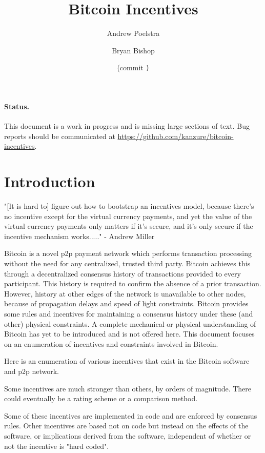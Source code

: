 \documentclass[letterpaper]{article}
\title{Bitcoin Incentives}
\author{Andrew Poelstra}
\author{Bryan Bishop}
\date{\gitAuthorDate{} (commit \texttt{\gitAbbrevHash)}}
\begin{document}
\maketitle

\paragraph{Status.} This document is a work in progress and is missing large
sections of text. Bug reports should be communicated at
\url{https://github.com/kanzure/bitcoin-incentives}.

\section{Introduction}

"[It is hard to] figure out how to bootstrap an incentives model, because
there's no incentive except for the virtual currency payments, and yet the
value of the virtual currency payments only matters if it's secure, and it's
only secure if the incentive mechanism works....." - Andrew Miller

Bitcoin is a novel p2p payment network which performs transaction processing
without the need for any centralized, trusted third party. Bitcoin achieves
this through a decentralized consensus history of transactions provided to
every participant. This history is required to confirm the absence of a prior
transaction. However, history at other edges of the network is unavailable to
other nodes, because of propagation delays and speed of light constraints.
Bitcoin provides some rules and incentives for maintaining a consensus history
under these (and other) physical constraints. A complete mechanical or physical
understanding of Bitcoin has yet to be introduced and is not offered here. This
document focuses on an enumeration of incentives and constraints involved in
Bitcoin.

Here is an enumeration of various incentives that exist in the Bitcoin software
and p2p network.

Some incentives are much stronger than others, by orders of magnitude. There
could eventually be a rating scheme or a comparison method.

Some of these incentives are implemented in code and are enforced by consensus
rules. Other incentives are based not on code but instead on the effects of the
software, or implications derived from the software, independent of whether or
not the incentive is "hard coded".
\end{document}

